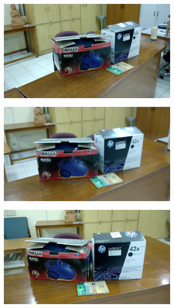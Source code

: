 \documentclass{article}
\begin{document}
\begin{enumerate}
\begin{figure}[H]
\begin{subfigure}{.33\textwidth}
					  	\centering
					  	\includegraphics[width=1.0\linewidth]{1_1_image.jpg}
					  	\caption{}
					  	\label{fig:sub2}
					\end{subfigure}
					\begin{subfigure}{.33\textwidth}
					  	\centering
					  	\includegraphics[width=1.0\linewidth]{1_2_image.jpg}
					  	\caption{}
					  	\label{fig:sub2}
					\end{subfigure}
					\begin{subfigure}{.33\textwidth}
					  	\centering
					  	\includegraphics[width=1.0\linewidth]{1_3_image.jpg}
					  	

\end{subfigure}
\end{figure}
\end{enumerate}
\end{document}
